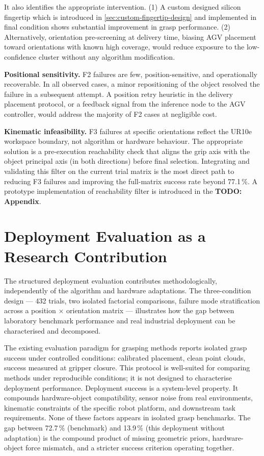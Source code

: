\documentclass[12pt, a4paper]{report}
\begin{document}
It also identifies the appropriate intervention. 
(1) A custom designed silicon fingertip which is introduced in \cref{sec:custom-fingertip-design} and implemented in final condition shows substantial improvement in grasp performance. 
(2) Alternatively, orientation pre-screening at delivery time, biasing AGV placement toward orientations with known high coverage, would reduce exposure to the low-confidence cluster without any algorithm modification.

\textbf{Positional sensitivity.} 
F2 failures are few, position-sensitive, and operationally recoverable. 
In all observed cases, a minor repositioning of the object resolved the failure in a subsequent attempt. 
A position retry heuristic in the delivery placement protocol, or a feedback signal from the inference node to the AGV controller, would address the majority of F2 cases at negligible cost.

\textbf{Kinematic infeasibility.} 
F3 failures at specific orientations reflect the UR10e workspace boundary, not algorithm or hardware behaviour. The appropriate solution is a pre-execution reachability check that aligns the grip axis with the object principal axis (in both directions) before final selection. Integrating and validating this filter on the current trial matrix is the most direct path to reducing F3 failures and improving the full-matrix success rate beyond 77.1\,\%. A prototype implementation of reachability filter is introduced in the \textbf{TODO: Appendix}. 

\section{Deployment Evaluation as a Research Contribution}

The structured deployment evaluation contributes methodologically, independently of the algorithm and hardware adaptations. The three-condition design --- 432 trials, two isolated factorial comparisons, failure mode stratification across a position $\times$ orientation matrix --- illustrates how the gap between laboratory benchmark performance and real industrial deployment can be characterised and decomposed.

The existing evaluation paradigm for grasping methods reports isolated grasp success under controlled conditions: calibrated placement, clean point clouds, success measured at gripper closure. This protocol is well-suited for comparing methods under reproducible conditions; 
it is not designed to characterise deployment performance. Deployment success is a system-level property. It compounds hardware-object compatibility, sensor noise from real environments, kinematic constraints of the specific robot platform, and downstream task requirements. None of these factors appears in isolated grasp benchmarks. The gap between 72.7\,\% (benchmark) and 13.9\,\% (this deployment without adaptation) is the compound product of missing geometric priors, hardware-object force mismatch, and a stricter success criterion operating together.
\end{document}
